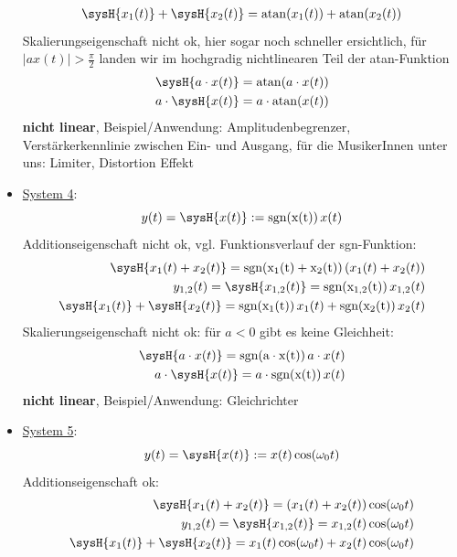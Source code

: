 \begin{Loesung}
\begin{itemize}
\begin{align}
\sysH{x_1(t)} + \sysH{x_2(t)} = \mathrm{atan}(x_1(t)) + \mathrm{atan}(x_2(t))
\end{align}
Skalierungseigenschaft nicht ok, hier sogar noch schneller ersichtlich, für
$|a x(t)|>\frac{\pi}{2}$ landen wir im hochgradig nichtlinearen Teil der atan-Funktion
\begin{align}
\sysH{a \cdot x(t)}= \mathrm{atan}(a \cdot x(t))\\
a \cdot \sysH{x(t)}= a \cdot \mathrm{atan}(x(t))
\end{align}
\textbf{nicht linear}, Beispiel/Anwendung: Amplitudenbegrenzer, Verstärkerkennlinie
zwischen Ein- und Ausgang, für die MusikerInnen unter uns: Limiter, Distortion Effekt
\item  \underline{System 4}:
\begin{equation}
y(t) = \sysH{x(t)}:= \mathrm{sgn(x(t))} \, x(t)
\end{equation}
Additionseigenschaft nicht ok, vgl. Funktionsverlauf der sgn-Funktion:
\begin{align}
\sysH{x_1(t)+x_2(t)}=\mathrm{sgn(x_1(t)+x_2(t))} \, (x_1(t)+x_2(t))\\
y_{1,2}(t) = \sysH{x_{1,2}(t)}= \mathrm{sgn(x_{1,2}(t))} \, x_{1,2}(t)\\
\sysH{x_1(t)} + \sysH{x_2(t)} = \mathrm{sgn(x_{1}(t))} \, x_{1}(t) + \mathrm{sgn(x_{2}(t))} \, x_{2}(t)
\end{align}
Skalierungseigenschaft nicht ok: für $a<0$ gibt es keine Gleichheit:
\begin{align}
\sysH{a \cdot x(t)}= \mathrm{sgn( a \cdot x(t))} \, a \cdot x(t)\\
a \cdot \sysH{x(t)}= a \cdot \mathrm{sgn(x(t))} \, x(t)
\end{align}
\textbf{nicht linear}, Beispiel/Anwendung: Gleichrichter
\item  \underline{System 5}:
\begin{equation}
y(t) = \sysH{x(t)}:= x(t) \cos(\omega_0 t)
\end{equation}
Additionseigenschaft ok:
\begin{align}
\sysH{x_1(t)+x_2(t)}=(x_1(t) + x_2(t)) \cos(\omega_0 t)\\
y_{1,2}(t) = \sysH{x_{1,2}(t)}= x_{1,2}(t) \cos(\omega_0 t)\\
\sysH{x_1(t)} + \sysH{x_2(t)} = x_{1}(t) \cos(\omega_0 t) + x_{2}(t) \cos(\omega_0 t)
\end{align}

\end{itemize}
\end{Loesung}
